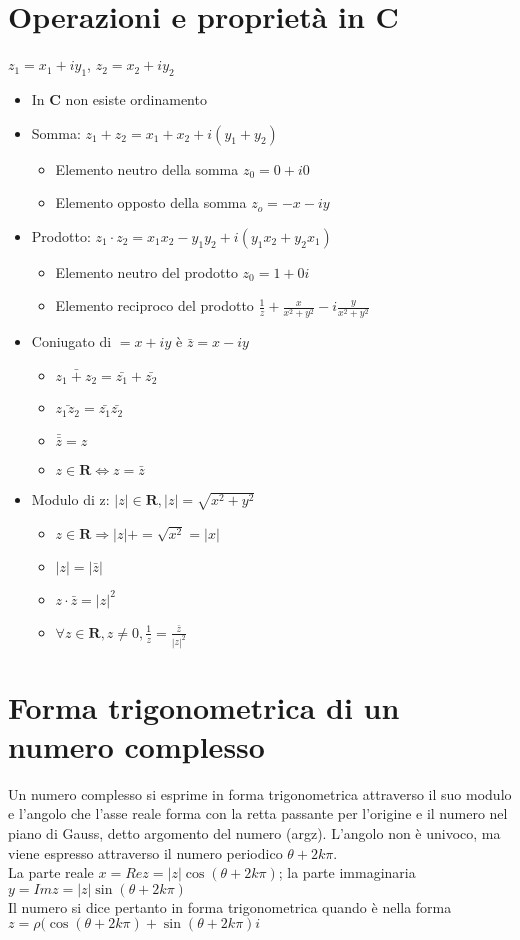 \section{Operazioni e propriet\`a in $\mathbf{C}$}
$z_1=x_1+iy_1$, $z_2=x_2+iy_2$
\begin{itemize}
\item In $\mathbf{C}$ non esiste ordinamento
\item Somma: $z_1+z_2=x_1+x_2+i(y_1+y_2)$
\begin{itemize}
\item Elemento neutro della somma $z_0=0+i0$
\item Elemento opposto della somma $z_o=-x-iy$
\end{itemize}
\item Prodotto: $z_1\cdot z_2=x_1x_2-y_1y_2+i(y_1x_2+y_2x_1)$
\begin{itemize}
\item Elemento neutro del prodotto $z_0=1+0i$
\item Elemento reciproco del prodotto $\frac{1}{z}+\frac{x}{x^2+y^2}-i\frac{y}{x^2+y^2}$
\end{itemize}
\item Coniugato di $=x+iy$ \`e $\bar{z}=x-iy$
\begin{itemize}
\item $\bar{z_1+z_2}=\bar{z_1}+\bar{z_2}$
\item $\bar{z_1z_2}=\bar{z_1}\bar{z_2}$
\item $\bar{\bar{z}}=z$
\item $z\in\mathbf{R}\Leftrightarrow z=\bar{z}$
\end{itemize}
\item Modulo di z: $|z|\in\mathbf{R}, |z|=	\sqrt{x^2+y^2}$
\begin{itemize}
\item $z\in\mathbf{R}\Rightarrow|z|+=\sqrt{x^2}=|x|$
\item $|z|=|\bar{z}|$
\item $z\cdot\bar{z}=|z|^2$
\item $\forall z\in\mathbf{R}, z\neq 0, \frac{1}{z}=\frac{\bar{z}}{|z|^2}$
\end{itemize}
\end{itemize}
\section{Forma trigonometrica di un numero complesso}
Un numero complesso si esprime in forma trigonometrica attraverso il suo modulo e l'angolo che l'asse reale forma con la retta passante per l'origine e il numero nel piano di 
Gauss, detto argomento del numero (argz). 
L'angolo non \`e univoco, ma viene espresso attraverso il numero periodico $\theta+2k\pi$.\\
La parte reale $x=Rez=|z|\cos(\theta+2k\pi)$; la parte immaginaria $y=Imz=|z|\sin(\theta+2k\pi)$\\
Il numero si dice pertanto in forma trigonometrica quando \`e nella forma $z=\rho(\cos(\theta+2k\pi)+\sin(\theta+2k\pi)i$
